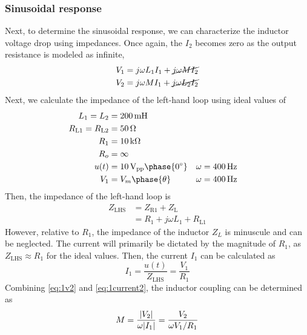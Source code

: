 \documentclass{report}
\newcommand{\pp}{_{pp}}
\newcommand{\Vpp}{\V\pp}
\begin{document}
\subsubsection{Sinusoidal response}
Next, to determine the sinusoidal response, we can characterize the inductor voltage drop using impedances. Once again, the $I_2$ becomes zero as the output resistance is modeled as infinite,
\begin{subequations}
	\begin{align}
		V_1 & = j \omega L_1 I_1 + \cancel{j \omega M I_2} \\
		V_2 & = j \omega M I_1 + \cancel{j \omega L_2 I_2} \label{eq:1v2}
	\end{align}
\end{subequations}
Next, we calculate the impedance of the left-hand loop using ideal values of \begin{align*}
	L_1 = L_2 & = \SI{200}{\milli\henry} \\
	R_\mathrm{L1} = R_\mathrm{L2} & = \SI{50}{\ohm} \\
	R_1 & = \SI{10}{\kohm} \\
	R_o & = \infty \\
	u(t) & = \SI{10}{\Vpp} \phase{0^\circ} && \omega=\SI{400}{\Hz} \\
	V_1 & = V_m \phase{\theta} && \omega = \SI{400}{\Hz}
\end{align*}
Then, the impedance of the left-hand loop is \begin{subequations}
	\begin{align}
		Z_\mathrm{LHS} & = Z_\mathrm{R1} + Z_\mathrm{L} \\
			& = R_1 + j\omega L_1 + R_\mathrm{L1}
	\end{align}
\end{subequations}
However, relative to $R_1$, the impedance of the inductor $Z_L$ is minuscule and can be neglected. The current will primarily be dictated by the magnitude of $R_1$, as $Z_\mathrm{LHS} \approx R_1$ for the ideal values. Then, the current $I_1$ can be calculated as
\begin{equation}
	I_1 = \frac{u(t)}{Z_\mathrm{LHS}} = \frac{V_1}{R_1} \label{eq:1current2}
\end{equation}
Combining \eqref{eq:1v2} and \eqref{eq:1current2}, the inductor coupling can be determined as
\begin{equation}
	M = \frac{\abs{V_2}}{\omega \abs{I_1}} = \frac{V_2}{\omega V_1 / R_1} \label{eq:msine}
\end{equation}
\end{document}
